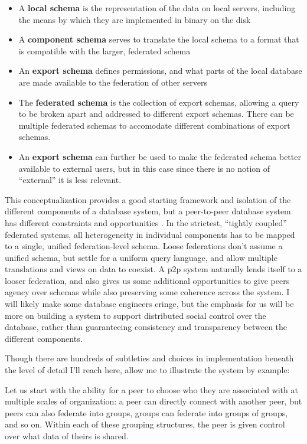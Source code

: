 \documentclass[10pt]{article}
\begin{document}
\begin{multicols}{2}
\begin{itemize}

\item
  A \textbf{local schema} is the representation of the data on local
  servers, including the means by which they are implemented in binary
  on the disk
\item
  A \textbf{component schema} serves to translate the local schema to a
  format that is compatible with the larger, federated schema
\item
  An \textbf{export schema} defines permissions, and what parts of the
  local database are made available to the federation of other servers
\item
  The \textbf{federated schema} is the collection of export schemas,
  allowing a query to be broken apart and addressed to different export
  schemas. There can be multiple federated schemas to accomodate
  different combinations of export schemas.
\item
  An \textbf{export schema} can further be used to make the federated
  schema better available to external users, but in this case since
  there is no notion of ``external'' it is less relevant.
\end{itemize}

This conceptualization provides a good starting framework and isolation
of the different components of a database system, but a peer-to-peer
database system has different constraints and opportunities \cite{bonifatiDistributedDatabasesPeertopeer2008} . In the strictest,
``tightly coupled'' federated systems, all heterogeneity in individual
components has to be mapped to a single, unified federation-level
schema. Loose federations don't assume a unified schema, but settle for
a uniform query language, and allow multiple translations and views on
data to coexist. A p2p system naturally lends itself to a looser
federation, and also gives us some additional opportunities to give
peers agency over schemas while also preserving some coherence across
the system. I will likely make some database engineers cringe, but the
emphasis for us will be more on building a system to support distributed
social control over the database, rather than guaranteeing consistency
and transparency between the different components.

Though there are hundreds of subtleties and choices in implementation
beneath the level of detail I'll reach here, allow me to illustrate the
system by example:

Let us start with the ability for a peer to choose who they are
associated with at multiple scales of organization: a peer can directly
connect with another peer, but peers can also federate into groups,
groups can federate into groups of groups, and so on. Within each of
these grouping structures, the peer is given control over what data of
theirs is shared.


\end{multicols}
\end{document}
